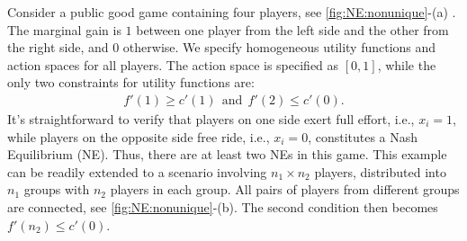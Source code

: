 \begin{example}
\label{eg:NE:nonunique}
Consider a public good game containing four players, see \cref{fig:NE:nonunique}-(a) . The marginal gain is $1$ between one player from the left side and the other from the right side, and $0$ otherwise. We specify homogeneous utility functions and action spaces for all players. The action space is specified as $[0,1]$, while the only two constraints for utility functions are: 
\begin{align*}
    f'(1) \ge c'(1)~~\mbox{and}~~
    f'(2) \le c'(0).
\end{align*}
It's straightforward to verify that players on one side exert full effort, i.e., $x_i = 1$,
while players on the opposite side free ride, i.e., $x_i = 0$, constitutes a Nash Equilibrium (NE). Thus, there are at least two NEs in this game. This example can be readily extended to a scenario involving $n_1\times n_2$ players, distributed into $n_1$ groups with $n_2$ players in each group. All pairs of players from different groups are connected, see \cref{fig:NE:nonunique}-(b). The second condition then becomes $f'(n_2) \le c'(0)$.
\end{example}